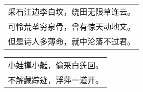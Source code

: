 \nopagebreak%
\nopagebreak%
\noindent\begin{minipage}{\linewidth}
  \vskip-3pt\begin{table}[H]
    \centering
    \begin{tabular}{@{}l@{}}
采石江边李白坟，绕田无限草连云。\\
可怜荒垄穷泉骨，曾有惊天动地文。\\
但是诗人多薄命，就中沦落不过君。
    \end{tabular}
  \end{table}
\end{minipage}
\vspace{1cm}


\nopagebreak%
\nopagebreak%
\noindent\begin{minipage}{\linewidth}
  \vskip-3pt\begin{table}[H]
    \centering
    \begin{tabular}{@{}l@{}}
小娃撑小艇，偷采白莲回。\\
不解藏踪迹，浮萍一道开。
    \end{tabular}
  \end{table}
\end{minipage}
\vspace{1cm}


